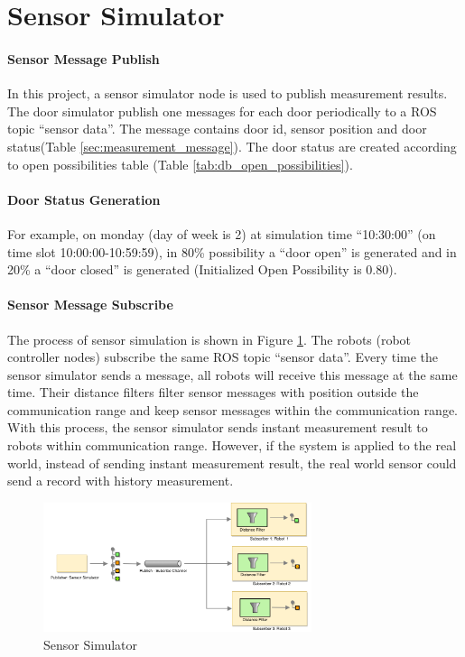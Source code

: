 \section{Sensor Simulator}
\label{sec:sensor_simulatior}

\paragraph{Sensor Message Publish}
In this project, a sensor simulator node is used to publish measurement results. The door simulator publish one messages for each door periodically to a ROS topic ``sensor data''. The message contains door id, sensor position and door status(Table \ref{sec:measurement_message}). The door status are created according to open possibilities table (Table \ref{tab:db_open_possibilities}). 


\paragraph{Door Status Generation}
For example, on monday (day of week is 2) at simulation time ``10:30:00'' (on time slot 10:00:00-10:59:59), in 80\% possibility a ``door open'' is generated and in 20\% a ``door closed'' is generated (Initialized Open Possibility is 0.80).


\paragraph{Sensor Message Subscribe}
The process of sensor simulation is shown in Figure \ref{sec:sensor_simulatior}. The robots (robot controller nodes) subscribe the same ROS topic ``sensor data''. Every time the sensor simulator sends a message, all robots will receive this message at the same time. Their distance filters filter sensor messages with position outside the communication range and keep sensor messages within the communication range. With this process, the sensor simulator sends instant measurement result to robots within communication range. However, if the system is applied to the real world, instead of sending instant measurement result, the real world sensor could send a record with history measurement.

\begin{figure}
\centering
\includegraphics[width = 0.7\textwidth]{content/images/ch4/sensor_simulator.drawio.png}
\caption{Sensor Simulator}
\label{fig:sensor_simulator}
\end{figure}

